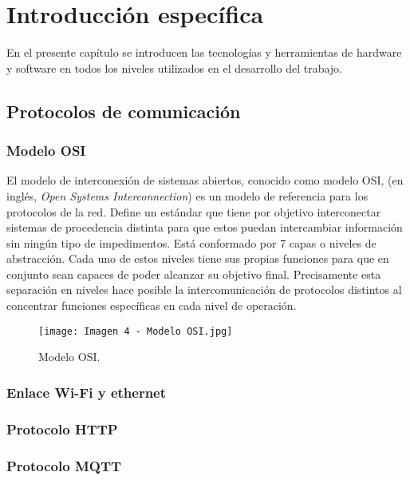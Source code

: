 \chapter{Introducción específica} %

\label{Chapter2}

En el presente capítulo se introducen las tecnologías y herramientas de hardware y software en todos los niveles utilizados en el desarrollo del trabajo. 

\section{Protocolos de comunicación}
\subsection{Modelo OSI}

El modelo de interconexión de sistemas abiertos, conocido como modelo OSI, (en inglés, \textit{Open Systems Interconnection}) es un modelo de referencia para los protocolos de la red. Define un estándar que tiene por objetivo interconectar sistemas de procedencia distinta para que estos puedan intercambiar información sin ningún tipo de impedimentos. Está conformado por 7 capas o niveles de abstracción. Cada uno de estos niveles tiene sus propias funciones para que en conjunto sean capaces de poder alcanzar su objetivo final. Precisamente esta separación en niveles hace posible la intercomunicación de protocolos distintos al concentrar funciones específicas en cada nivel de operación. \citep{8}

\begin{figure}[h]
\centering
\texttt{[image: Imagen 4 - Modelo OSI.jpg]}
\caption[Modelo OSI]{Modelo OSI. \footnotemark}
\label{fig:4}
\end{figure}

\subsection{Enlace Wi-Fi y ethernet}



\subsection{Protocolo HTTP}



\subsection{Protocolo MQTT}